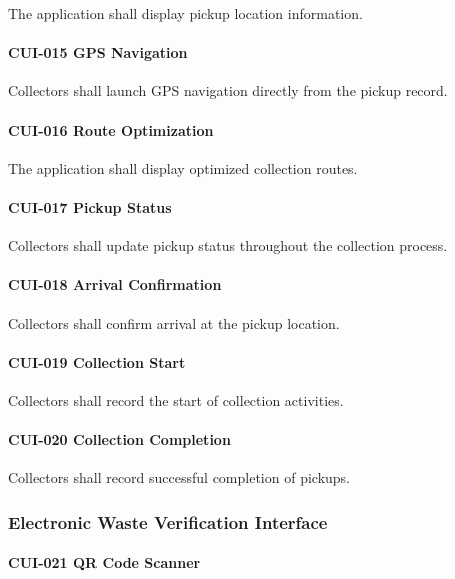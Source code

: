 The application shall display pickup location information.

\paragraph{CUI-015 GPS Navigation}

Collectors shall launch GPS navigation directly from the pickup record.

\paragraph{CUI-016 Route Optimization}

The application shall display optimized collection routes.

\paragraph{CUI-017 Pickup Status}

Collectors shall update pickup status throughout the collection process.

\paragraph{CUI-018 Arrival Confirmation}

Collectors shall confirm arrival at the pickup location.

\paragraph{CUI-019 Collection Start}

Collectors shall record the start of collection activities.

\paragraph{CUI-020 Collection Completion}

Collectors shall record successful completion of pickups.


\subsubsection*{Electronic Waste Verification Interface}

\paragraph{CUI-021 QR Code Scanner}

